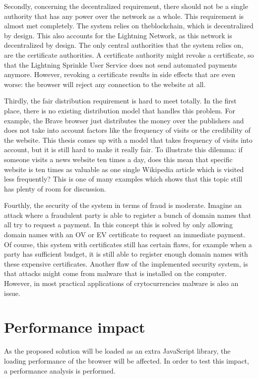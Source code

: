 Secondly, concerning the decentralized requirement, there should not be a single authority that has any power over the network as a whole. This requirement is almost met completely. The system relies on theblockchain, which is decentralized by design. This also accounts for the Lightning Network, as this network is decentralized by design. The only central authorities that the system relies on, are the certificate authorities. A certificate authority might revoke a certificate, so that the Lightning Sprinkle User Service does not send automated payments anymore. However, revoking a certificate results in side effects that are even worse: the browser will reject any connection to the website at all.

Thirdly, the fair distribution requirement is hard to meet totally. In the first place, there is no existing distribution model that handles this problem. For example, the Brave browser just distributes the money over the publishers and does not take into account factors like the frequency of visits or the credibility of the website. This thesis comes up with a model that takes frequency of visits into account, but it is still hard to make it really fair. To illustrate this dilemma: if someone visits a news website ten times a day, does this mean that specific website is ten times as valuable as one single Wikipedia article which is visited less frequently? This is one of many examples which shows that this topic still has plenty of room for discussion. 


Fourthly, the security of the system in terms of fraud is moderate. Imagine an attack where a fraudulent party is able to register a bunch of domain names that all try to request a payment. In this concept this is solved by only allowing domain names with an OV or EV certificate to request an immediate payment. Of course, this system with certificates still has certain flaws, for example when a party has sufficient budget, it is still able to register enough domain names with these expensive certificates. Another flaw of the implemented security system, is that attacks might come from malware that is installed on the computer. However, in most practical applications of crytocurrencies malware is also an issue.


\section{Performance impact}
As the proposed solution will be loaded as an extra JavaScript library, the loading performance of the browser will be affected. In order to test this impact, a performance analysis is performed.


